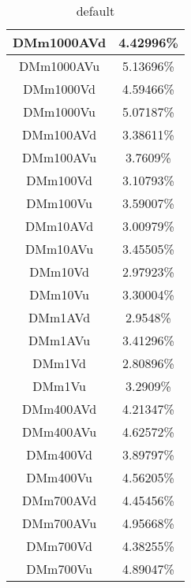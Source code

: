 \begin{table}[htdp]
\caption{default}
\begin{center}
\begin{tabular}{|c|c|}
\hline
DMm1000AVd & 4.42996\%\\
\hline
DMm1000AVu & 5.13696\%\\
\hline
DMm1000Vd & 4.59466\%\\
\hline
DMm1000Vu & 5.07187\%\\
\hline
DMm100AVd & 3.38611\%\\
\hline
DMm100AVu & 3.7609\%\\
\hline
DMm100Vd & 3.10793\%\\
\hline
DMm100Vu & 3.59007\%\\
\hline
DMm10AVd & 3.00979\%\\
\hline
DMm10AVu & 3.45505\%\\
\hline
DMm10Vd & 2.97923\%\\
\hline
DMm10Vu & 3.30004\%\\
\hline
DMm1AVd & 2.9548\%\\
\hline
DMm1AVu & 3.41296\%\\
\hline
DMm1Vd & 2.80896\%\\
\hline
DMm1Vu & 3.2909\%\\
\hline
DMm400AVd & 4.21347\%\\
\hline
DMm400AVu & 4.62572\%\\
\hline
DMm400Vd & 3.89797\%\\
\hline
DMm400Vu & 4.56205\%\\
\hline
DMm700AVd & 4.45456\%\\
\hline
DMm700AVu & 4.95668\%\\
\hline
DMm700Vd & 4.38255\%\\
\hline
DMm700Vu & 4.89047\%\\
\hline
\end{tabular}
\end{center}
\label{default}
\end{table}
